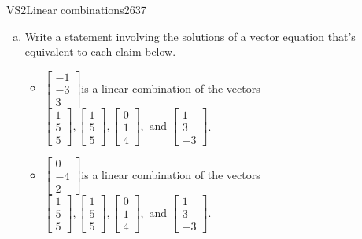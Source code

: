 \begin{exercise}{VS2}{Linear combinations}{2637} 
\begin{exerciseStatement} 

\begin{enumerate}[(a)]
\item  

 Write a statement involving the solutions of a vector equation that's equivalent to each claim below. 

 

\begin{itemize}
\item  

 \(\left[\begin{array}{c}
-1 \\
-3 \\
3
\end{array}\right]\)is a linear combination of the vectors \(\left[\begin{array}{c}
1 \\
5 \\
5
\end{array}\right] , \left[\begin{array}{c}
1 \\
5 \\
5
\end{array}\right] , \left[\begin{array}{c}
0 \\
1 \\
4
\end{array}\right] , \text{ and } \left[\begin{array}{c}
1 \\
3 \\
-3
\end{array}\right]\). 

 
\item  

 \(\left[\begin{array}{c}
0 \\
-4 \\
2
\end{array}\right]\)is a linear combination of the vectors \(\left[\begin{array}{c}
1 \\
5 \\
5
\end{array}\right] , \left[\begin{array}{c}
1 \\
5 \\
5
\end{array}\right] , \left[\begin{array}{c}
0 \\
1 \\
4
\end{array}\right] , \text{ and } \left[\begin{array}{c}
1 \\
3 \\
-3
\end{array}\right]\). 


\end{itemize}
\end{enumerate}
\end{exerciseStatement}
\end{exercise}
